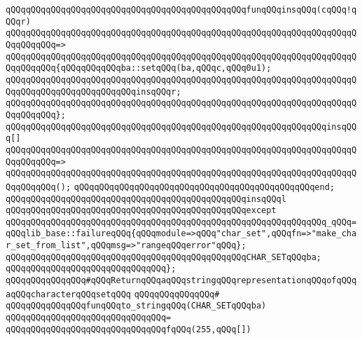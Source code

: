 \verb|qQQqqQQqqQQqqQQqqQQqqQQqqQQqqQQqqQQqqQQqqQQqqQQqfunqQQqinsqQQq(cqQQq!qQQqr)|\newline
\verb|qQQqqQQqqQQqqQQqqQQqqQQqqQQqqQQqqQQqqQQqqQQqqQQqqQQqqQQqqQQqqQQqqQQqqQQqqQQqqQQq=>|\newline
\verb|qQQqqQQqqQQqqQQqqQQqqQQqqQQqqQQqqQQqqQQqqQQqqQQqqQQqqQQqqQQqqQQqqQQqqQQqqQQqqQQq{qQQqqQQqqQQqba::setqQQq(ba,qQQqc,qQQq0u1);|\newline
\verb|qQQqqQQqqQQqqQQqqQQqqQQqqQQqqQQqqQQqqQQqqQQqqQQqqQQqqQQqqQQqqQQqqQQqqQQqqQQqqQQqqQQqqQQqqQQqqQQqinsqQQqr;|\newline
\verb|qQQqqQQqqQQqqQQqqQQqqQQqqQQqqQQqqQQqqQQqqQQqqQQqqQQqqQQqqQQqqQQqqQQqqQQqqQQqqQQq};|\newline
\newline
\verb|qQQqqQQqqQQqqQQqqQQqqQQqqQQqqQQqqQQqqQQqqQQqqQQqqQQqqQQqqQQqqQQqinsqQQq[]|\newline
\verb|qQQqqQQqqQQqqQQqqQQqqQQqqQQqqQQqqQQqqQQqqQQqqQQqqQQqqQQqqQQqqQQqqQQqqQQqqQQqqQQq=>|\newline
\verb|qQQqqQQqqQQqqQQqqQQqqQQqqQQqqQQqqQQqqQQqqQQqqQQqqQQqqQQqqQQqqQQqqQQqqQQqqQQqqQQq();|\newline
\verb|qQQqqQQqqQQqqQQqqQQqqQQqqQQqqQQqqQQqqQQqqQQqqQQqend;|\newline
\newline
\verb|qQQqqQQqqQQqqQQqqQQqqQQqqQQqqQQqqQQqqQQqqQQqqQQqinsqQQql|\newline
\verb|qQQqqQQqqQQqqQQqqQQqqQQqqQQqqQQqqQQqqQQqqQQqqQQqexcept|\newline
\verb|qQQqqQQqqQQqqQQqqQQqqQQqqQQqqQQqqQQqqQQqqQQqqQQqqQQqqQQqqQQqqQQq_qQQq=qQQqlib_base::failureqQQq{qQQqmodule=>qQQq"char_set",qQQqfn=>"make_char_set_from_list",qQQqmsg=>"rangeqQQqerror"qQQq};|\newline
\newline
\verb|qQQqqQQqqQQqqQQqqQQqqQQqqQQqqQQqqQQqqQQqqQQqqQQqCHAR_SETqQQqba;|\newline
\verb|qQQqqQQqqQQqqQQqqQQqqQQqqQQqqQQq};|\newline
\newline
\verb|qQQqqQQqqQQqqQQq#qQQqReturnqQQqaqQQqstringqQQqrepresentationqQQqofqQQqaqQQqcharacterqQQqsetqQQq|\newline
\verb|qQQqqQQqqQQqqQQq#|\newline
\verb|qQQqqQQqqQQqqQQqfunqQQqto_stringqQQq(CHAR_SETqQQqba)|\newline
\verb|qQQqqQQqqQQqqQQqqQQqqQQqqQQqqQQq=|\newline
\verb|qQQqqQQqqQQqqQQqqQQqqQQqqQQqqQQqfqQQq(255,qQQq[])|\newline
